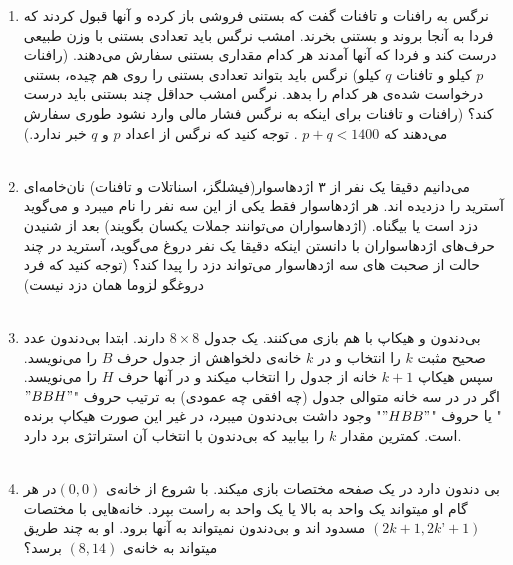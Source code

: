 \documentclass{article}
\begin{document}
\begin{enumerate}
		\item 
نرگس به رافنات و تافنات گفت که بستنی فروشی باز کرده و آنها قبول کردند که فردا به آنجا بروند و بستنی بخرند. امشب نرگس باید تعدادی بستنی با وزن طبیعی درست کند و فردا که آنها آمدند هر کدام مقداری بستنی سفارش می‌دهند. (رافنات $p$ کیلو و تافنات $q$ کیلو) نرگس باید بتواند تعدادی بستنی را روی هم چیده، بستنی درخواست شده‌ی هر کدام را بدهد. نرگس امشب حداقل چند بستنی باید درست کند؟ (رافنات و تافنات برای اینکه به نرگس فشار مالی وارد نشود طوری سفارش می‌دهند که 
$p + q < 1400$
.
 توجه کنید که نرگس از اعداد $p$ و $q$ خبر ندارد.)\\
 \\
    	\item 
می‌دانیم دقیقا یک نفر از ۳ اژدهاسوار(فیشلگز، اسناتلات و تافنات) نان‌خامه‌ای آسترید را دزدیده اند. هر اژدهاسوار فقط یکی از این سه نفر را نام میبرد و می‌گوید دزد است یا بیگناه. (اژدهاسواران می‌توانند جملات یکسان بگویند) بعد از شنیدن حرف‌های اژدهاسواران با دانستن اینکه دقیقا یک نفر دروغ می‌گوید، آسترید در چند حالت از صحبت های سه اژدهاسوار می‌تواند دزد را پیدا کند؟ (توجه کنید که فرد دروغگو لزوما همان دزد نیست)\\
\\
    \item
بی‌دندون و هیکاپ با هم بازی می‌کنند. یک جدول $ 8\times 8$ دارند. ابتدا بی‌دندون عدد صحیح مثبت $k$ را انتخاب و در $k$ خانه‌ی دلخواهش از جدول حرف $B$ را می‌نویسد. سپس هیکاپ $k+1$ خانه از جدول را انتخاب میکند و در آنها حرف $H$ را می‌نویسد. اگر در در سه خانه متوالی جدول (چه افقی چه عمودی) به ترتیب حروف "$"B B H"$" یا حروف "$"H B B"$" وجود داشت بی‌دندون میبرد، در غیر این صورت هیکاپ برنده است. کمترین مقدار $k$ را بیابید که بی‌دندون با انتخاب آن استراتژی برد دارد.\\
\\
    \item
بی دندون دارد در یک صفحه مختصات بازی میکند. با شروع از خانه‌ی $(0,0) $در هر گام او میتواند یک واحد به بالا یا یک واحد به راست بپرد. خانه‌هایی با مختصات $(2k+1, 2k’+1)$ مسدود اند و بی‌دندون نمیتواند به آنها برود. او به چند طریق میتواند به خانه‌ی $(8,14)$ برسد؟
	\end{enumerate}
\end{document}
